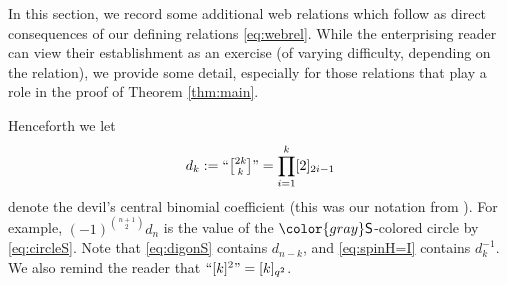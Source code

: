 \documentclass[10pt]{amsart}
\newcommand{\gray}[1]{{\color{gray}#1}}
\numberwithin{equation}{section}
\theoremstyle{definition}
\newcommand{\gS}{\gray{\mathsf{S}}}
\newcommand{\dd}{d}
\begin{document}
In this section, we record some additional web relations 
which follow as direct consequences of our defining relations \eqref{eq:webrel}.
While the enterprising reader can view their establishment as an exercise 
(of varying difficulty, depending on the relation), 
we provide some detail, especially for those relations 
that play a role in the proof of Theorem \ref{thm:main}.

Henceforth we let 
\[
\dd_k := ``{\textstyle {2k \brack k}}" = \prod_{i=1}^{k} [2]_{2i-1}
\]
denote the devil's central binomial coefficient
(this was our notation from \cite{BER}).
For example, $(-1)^{n+1 \choose 2}\dd_n$ is the value of the $\gS$-colored circle by \eqref{eq:circleS}. 
Note that \eqref{eq:digonS} contains $\dd_{n-k}$, and \eqref{eq:spinH=I} contains $\dd_k^{-1}$.
We also remind the reader that $``[k]^2"=[k]_{q^{2}}$.
\end{document}
